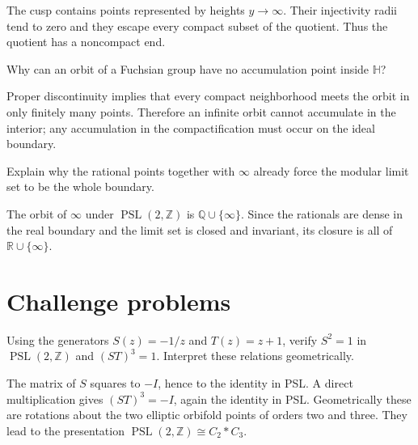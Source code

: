 \begin{solution}
The cusp contains points represented by heights \(y\to\infty\).  Their injectivity radii tend to zero and they escape every compact subset of the quotient.  Thus the quotient has a noncompact end.
\end{solution}

\begin{problem}\label{prob:vii35-11}
Why can an orbit of a Fuchsian group have no accumulation point inside \(\mathbb H\)?
\end{problem}

\begin{solution}
Proper discontinuity implies that every compact neighborhood meets the orbit in only finitely many points.  Therefore an infinite orbit cannot accumulate in the interior; any accumulation in the compactification must occur on the ideal boundary.
\end{solution}

\begin{problem}\label{prob:vii35-12}
Explain why the rational points together with \(\infty\) already force the modular limit set to be the whole boundary.
\end{problem}

\begin{solution}
The orbit of \(\infty\) under \(\operatorname{PSL}(2,\mathbb Z)\) is \(\mathbb Q\cup\{\infty\}\).  Since the rationals are dense in the real boundary and the limit set is closed and invariant, its closure is all of \(\mathbb R\cup\{\infty\}\).
\end{solution}

\section{Challenge problems}

\begin{problem}\label{prob:vii35-ch01}
Using the generators \(S(z)=-1/z\) and \(T(z)=z+1\), verify \(S^2=1\) in \(\operatorname{PSL}(2,\mathbb Z)\) and \((ST)^3=1\).  Interpret these relations geometrically.
\end{problem}

\begin{solution}
The matrix of \(S\) squares to \(-I\), hence to the identity in PSL.  A direct multiplication gives \((ST)^3=-I\), again the identity in PSL.  Geometrically these are rotations about the two elliptic orbifold points of orders two and three.  They lead to the presentation \(\operatorname{PSL}(2,\mathbb Z)\cong C_2*C_3\).
\end{solution}

